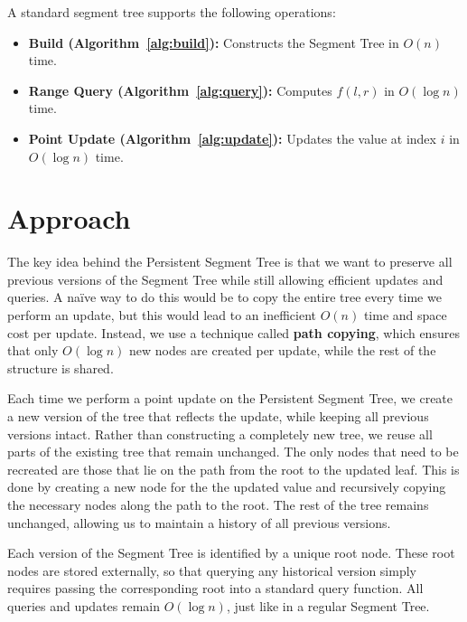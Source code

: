 \documentclass{fairmeta}
\numberwithin{equation}{section}
\begin{document}
A standard segment tree supports the following operations:
\begin{itemize}
    \item \textbf{Build (Algorithm~\ref{alg:build}):} Constructs the Segment Tree in $O(n)$ time.
    \item \textbf{Range Query (Algorithm~\ref{alg:query}):} Computes $f(l, r)$ in $O(\log n)$ time.
    \item \textbf{Point Update (Algorithm~\ref{alg:update}):} Updates the value at index $i$ in $O(\log n)$ time.
\end{itemize}


\section{Approach}\label{section:approach}

The key idea behind the Persistent Segment Tree is that we want to preserve all previous versions of the Segment Tree while still allowing efficient updates and queries. A naïve way to do this would be to copy the entire tree every time we perform an update, but this would lead to an inefficient $O(n)$ time and space cost per update. Instead, we use a technique called \textbf{path copying}, which ensures that only $O(\log n)$ new nodes are created per update, while the rest of the structure is shared.

Each time we perform a point update on the Persistent Segment Tree, we create a new version of the tree that reflects the update, while keeping all previous versions intact. Rather than constructing a completely new tree, we reuse all parts of the existing tree that remain unchanged. The only nodes that need to be recreated are those that lie on the path from the root to the updated leaf. This is done by creating a new node for the the updated value and recursively copying the necessary nodes along the path to the root. The rest of the tree remains unchanged, allowing us to maintain a history of all previous versions.

Each version of the Segment Tree is identified by a unique root node. These root nodes are stored externally, so that querying any historical version simply requires passing the corresponding root into a standard query function. All queries and updates remain $O(\log n)$, just like in a regular Segment Tree.
\end{document}
